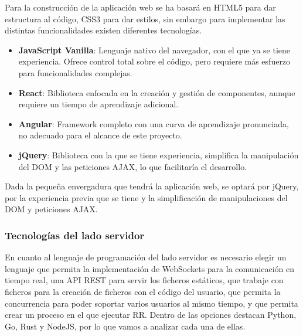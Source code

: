 Para la construcción de la aplicación web se ha basará en HTML5 para dar estructura al código, CSS3 para dar estilos, sin embargo para implementar las distintas funcionalidades existen diferentes tecnologías.

\begin{itemize}
    \item \textbf{JavaScript Vanilla}: Lenguaje nativo del navegador, con el que ya se tiene experiencia. Ofrece control total sobre el código, pero requiere más esfuerzo para funcionalidades complejas.
    \item \textbf{React}: Biblioteca enfocada en la creación y gestión de componentes, aunque requiere un tiempo de aprendizaje adicional.
    \item \textbf{Angular}: Framework completo con una curva de aprendizaje pronunciada, no adecuado para el alcance de este proyecto.
    \item \textbf{jQuery}: Biblioteca con la que se tiene experiencia, simplifica la manipulación del DOM y las peticiones AJAX, lo que facilitaría el desarrollo.
\end{itemize}

Dada la pequeña envergadura que tendrá la aplicación web, se optará por jQuery, por la experiencia previa que se tiene y la simplificación de manipulaciones del DOM y peticiones AJAX.

\subsubsection{Tecnologías del lado servidor} \label{sec:tecnologias-servidor}

En cuanto al lenguaje de programación del lado servidor es necesario elegir un lenguaje que permita la implementación de WebSockets para la comunicación en tiempo real, una API REST para servir los ficheros estáticos, que trabaje con ficheros para la creación de ficheros con el código del usuario, que permita la concurrencia para poder soportar varios usuarios al mismo tiempo, y que permita crear un proceso en el que ejecutar RR.
Dentro de las opciones destacan Python, Go, Rust y NodeJS, por lo que vamos a analizar cada una de ellas.

